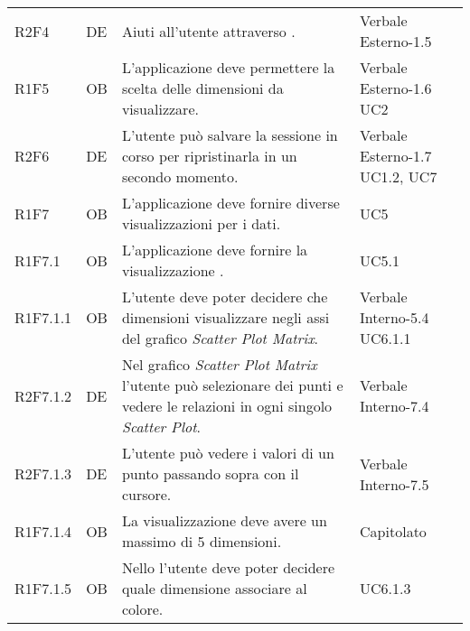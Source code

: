 {\begin{longtable}{C{2cm} | C{1.5cm} | C{9cm} | C{3.3cm}}
R2F4 & DE & Aiuti all'utente attraverso . & Verbale Esterno-1.5 \\
R1F5 & OB & L'applicazione deve permettere la scelta delle dimensioni da visualizzare. & Verbale Esterno-1.6 \newline UC2\\
R2F6 & DE & L'utente può salvare la sessione in corso per ripristinarla in un secondo momento. & Verbale Esterno-1.7 \newline UC1.2, UC7\\
R1F7 & OB & L'applicazione deve fornire diverse visualizzazioni per i dati. & UC5\\
R1F7.1 & OB & L'applicazione deve fornire la visualizzazione . & UC5.1\\
R1F7.1.1 & OB & L'utente deve poter decidere che dimensioni visualizzare negli assi del grafico \textit{Scatter Plot Matrix}. & Verbale Interno-5.4 \newline UC6.1.1\\
R2F7.1.2 & DE & Nel grafico \textit{Scatter Plot Matrix} l'utente può selezionare dei punti e vedere le relazioni in ogni singolo \textit{Scatter Plot}. & Verbale Interno-7.4\\
R2F7.1.3 & DE & L'utente può vedere i valori di un punto passando sopra con il cursore. & Verbale Interno-7.5\\

R1F7.1.4 & OB & La visualizzazione  deve avere un massimo di 5 dimensioni. & Capitolato\\

R1F7.1.5 & OB & Nello  l'utente deve poter decidere quale dimensione associare al colore. & UC6.1.3\\


\end{longtable}}
